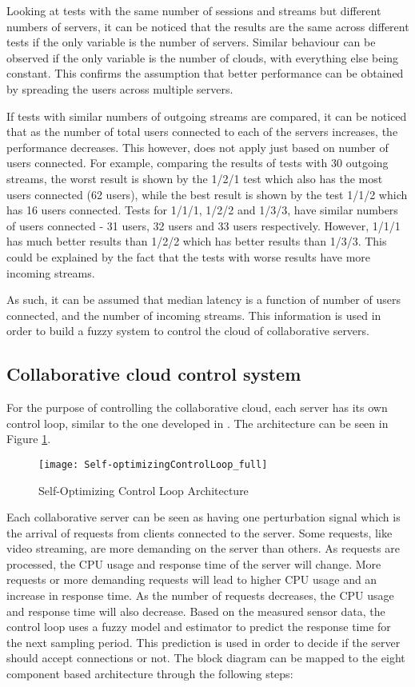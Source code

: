 Looking at tests with the same number of sessions and streams but different numbers of servers, it can be noticed that the results are the same across different tests if the only variable is the number of servers. Similar behaviour can be observed if the only variable is the number of clouds, with everything else being constant. This confirms the assumption that better performance can be obtained by spreading the users across multiple servers.

If tests with similar numbers of outgoing streams are compared, it can be noticed that as the number of total users connected to each of the servers increases, the performance decreases. This however, does not apply just based on number of users connected. For example, comparing the results of tests with 30 outgoing streams, the worst result is shown by the 1/2/1 test which also has the most users connected (62 users), while the best result is shown by the test 1/1/2 which has 16 users connected. Tests for 1/1/1, 1/2/2 and 1/3/3, have similar numbers of users connected - 31 users, 32 users and 33 users respectively. However, 1/1/1 has much better results than 1/2/2 which has better results than 1/3/3. This could be explained by the fact that the tests with worse results have more incoming streams.

As such, it can be assumed that median latency is a function of number of users connected, and the number of incoming streams. This information is used in order to build a fuzzy system to control the cloud of collaborative servers.

\subsection{Collaborative cloud control system}

For the purpose of controlling the collaborative cloud, each server has its own control loop, similar to the one developed in \cite{bogdan:seams07}. The architecture can be seen in Figure \ref{fig:selfopt-archi}.

\begin{figure}
	\centering
	\texttt{[image: Self-optimizingControlLoop\_full]}
	\caption{Self-Optimizing Control Loop Architecture}
	\label{fig:selfopt-archi}
\end{figure}

Each collaborative server can be seen as having one perturbation signal which is the arrival of requests from clients connected to the server. Some requests, like video streaming, are more demanding on the server than others. As requests are processed, the CPU usage and response time of the server will change. More requests or more demanding requests will lead to higher CPU usage and an increase in response time. As the number of requests decreases, the CPU usage and response time will also decrease. Based on the measured sensor data, the control loop uses a fuzzy model and estimator to predict the response time for the next sampling period. This prediction is used in order to decide if the server should accept connections or not. The block diagram can be mapped to the eight component based architecture through the following steps:

